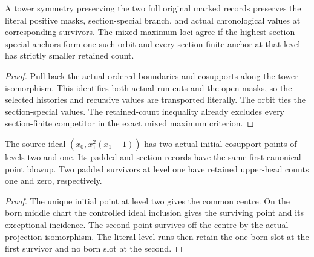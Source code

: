 \begin{theorem}
\label{hir:g1-actual-mixed-survivor-symmetry}
\leanok
A tower symmetry preserving the two full original marked records
preserves the literal positive masks, section-special branch,
and actual chronological values at corresponding survivors.
The mixed maximum loci agree if the highest section-special
anchors form one such orbit and every section-finite anchor at
that level has strictly smaller retained count.
\end{theorem}
\begin{proof}
Pull back the actual ordered boundaries and cosupports along
the tower isomorphism. This identifies both actual run cuts and
the open masks, so the selected histories and recursive values
are transported literally. The orbit ties the section-special
values. The retained-count inequality already excludes every
section-finite competitor in the exact mixed maximum criterion.
\end{proof}

\begin{theorem}
\label{hir:g1-common-canonical-unequal-born-counts}
\leanok
The source ideal $(x_0,x_1^2(x_1-1))$ has two actual initial
cosupport points of levels two and one. Its padded and section
records have the same first canonical point blowup. Two padded
survivors at level one have retained upper-head counts one and
zero, respectively.
\end{theorem}
\begin{proof}
The unique initial point at level two gives the common centre.
On the born middle chart the controlled ideal inclusion gives
the surviving point and its exceptional incidence. The second
point survives off the centre by the actual projection isomorphism.
The literal level runs then retain the one born slot at the first
survivor and no born slot at the second.
\end{proof}

